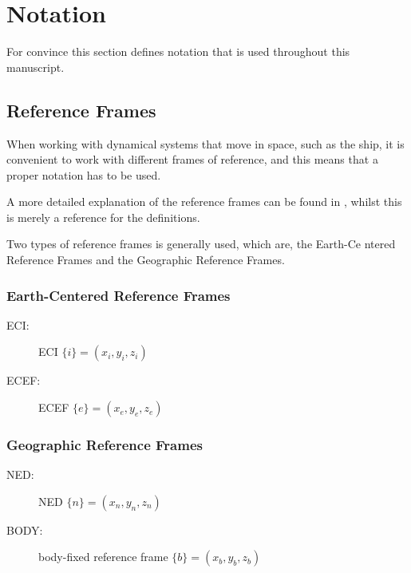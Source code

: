 \section{Notation}
For convince this section defines notation that is used throughout
this manuscript.

\subsection{Reference Frames}
When working with dynamical systems that move in space, such as the
ship, it is convenient to work with different frames of reference, and
this means that a proper notation has to be used. 

A more detailed explanation of the reference frames can be found in
\citep{fossen}, whilst this is merely a reference for the definitions.

Two types of reference frames is generally used, which are, the
Earth-Ce ntered Reference Frames and the Geographic Reference Frames.

\subsubsection{Earth-Centered Reference Frames}
\begin{description}
	\item[ECI:] \acl{ECI} $\{i\} = (x_i, y_i, z_i)$
	\item[ECEF:] \acl{ECEF} $\{e\} = (x_e, y_e, z_e)$
\end{description}

\subsubsection{Geographic Reference Frames}
\begin{description}
	\item[NED:] \acl{NED} $\{n\} = (x_n, y_n, z_n)$
	\item[BODY:] body-fixed reference frame $\{b\} = (x_b, y_b, z_b)$
\end{description}


